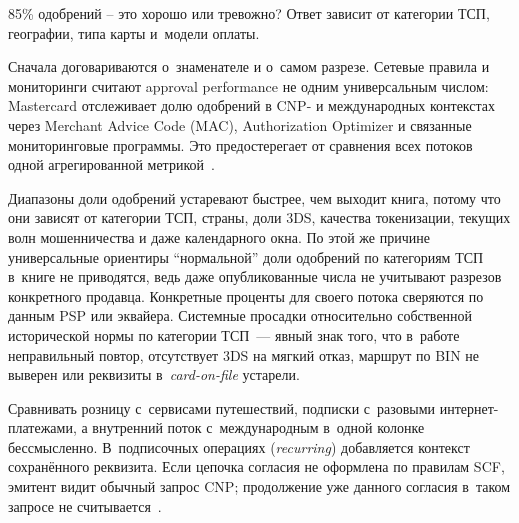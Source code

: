 85\% одобрений -- это хорошо или тревожно? Ответ зависит от
категории ТСП, географии, типа карты и~модели оплаты.

Сначала договариваются о~знаменателе и о~самом разрезе. Сетевые
правила и мониторинги считают approval performance не одним
универсальным числом: Mastercard отслеживает долю одобрений
в CNP- и международных контекстах через Merchant Advice
Code (MAC), Authorization Optimizer и связанные
мониторинговые программы. Это предостерегает от сравнения
всех потоков одной агрегированной метрикой~\cite{mc-tpr}.

Диапазоны доли одобрений устаревают быстрее, чем выходит книга,
потому что они зависят от категории ТСП, страны, доли 3DS,
качества токенизации, текущих волн мошенничества и даже
календарного окна. По этой же причине универсальные ориентиры
\enquote{нормальной} доли одобрений по категориям ТСП в~книге
не приводятся, ведь даже опубликованные числа не учитывают
разрезов конкретного продавца. Конкретные
проценты для своего потока сверяются по данным PSP или
эквайера. Системные просадки относительно собственной
исторической нормы по категории ТСП~--- явный знак того, что в~работе
неправильный повтор, отсутствует 3DS на мягкий отказ, маршрут по BIN
не выверен или реквизиты в~\textit{card-on-file} устарели.

Сравнивать розницу с~сервисами путешествий, подписки с~разовыми
интернет-платежами, а внутренний поток с~международным в~одной колонке
бессмысленно. В~подписочных операциях (\textit{recurring}) добавляется контекст
сохранённого реквизита. Если цепочка согласия не оформлена по
правилам SCF, эмитент видит обычный запрос CNP; продолжение
уже данного согласия в~таком запросе не считывается~\cite{visa-scf,mc-tpr}.

